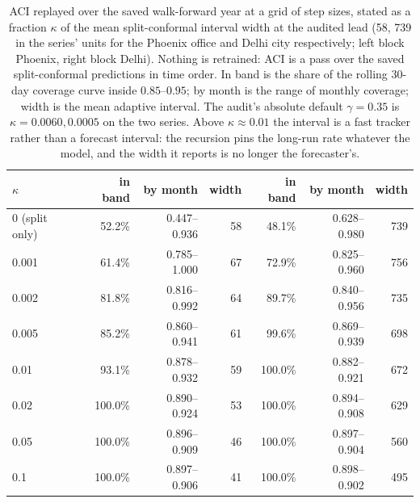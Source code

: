 \begin{table}[t]
\centering
\footnotesize
\setlength{\tabcolsep}{3pt}
\begin{tabular}{lrrrrrr}
\toprule
$\kappa$ & in band & by month & width & in band & by month & width \\
\midrule
0 (split only) & 52.2\% & 0.447--0.936 & 58 & 48.1\% & 0.628--0.980 & 739 \\
0.001 & 61.4\% & 0.785--1.000 & 67 & 72.9\% & 0.825--0.960 & 756 \\
0.002 & 81.8\% & 0.816--0.992 & 64 & 89.7\% & 0.840--0.956 & 735 \\
0.005 & 85.2\% & 0.860--0.941 & 61 & 99.6\% & 0.869--0.939 & 698 \\
0.01 & 93.1\% & 0.878--0.932 & 59 & 100.0\% & 0.882--0.921 & 672 \\
0.02 & 100.0\% & 0.890--0.924 & 53 & 100.0\% & 0.894--0.908 & 629 \\
0.05 & 100.0\% & 0.896--0.909 & 46 & 100.0\% & 0.897--0.904 & 560 \\
0.1 & 100.0\% & 0.897--0.906 & 41 & 100.0\% & 0.898--0.902 & 495 \\
\bottomrule
\end{tabular}
\caption{ACI replayed over the saved walk-forward year at a grid of step sizes, stated as a fraction $\kappa$ of the mean split-conformal interval width at the audited lead (58, 739 in the series' units for the Phoenix office and Delhi city respectively; left block Phoenix, right block Delhi). Nothing is retrained: ACI is a pass over the saved split-conformal predictions in time order. In band is the share of the rolling 30-day coverage curve inside $0.85$--$0.95$; by month is the range of monthly coverage; width is the mean adaptive interval. The audit's absolute default $\gamma=0.35$ is $\kappa = 0.0060, 0.0005$ on the two series. Above $\kappa \approx 0.01$ the interval is a fast tracker rather than a forecast interval: the recursion pins the long-run rate whatever the model, and the width it reports is no longer the forecaster's.}
\label{tab:aci-gamma}
\end{table}
